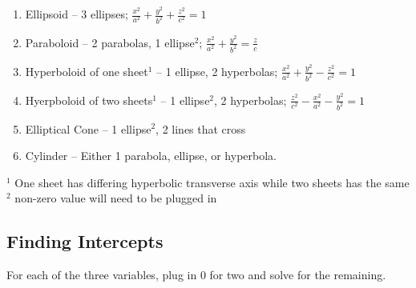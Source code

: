 \documentclass[12pt]{article}
\begin{document}
\begin{enumerate}
    \item Ellipsoid -- 3 ellipses; $\frac{x^2}{a^2}+\frac{y^2}{b^2}+\frac{z^2}{c^2}=1$
    \item Paraboloid -- 2 parabolas, 1 ellipse$^2$; $\frac{x^2}{a^2}+\frac{y^2}{b^2}=\frac{z}{c}$
    \item Hyperboloid of one sheet$^1$ -- 1 ellipse, 2 hyperbolas; $\frac{x^2}{a^2}+\frac{y^2}{b^2}-\frac{z^2}{c^2}=1$
    \item Hyerpboloid of two sheets$^1$ -- 1 ellipse$^2$, 2 hyperbolas; $\frac{z^2}{c^2}-\frac{x^2}{a^2}-\frac{y^2}{b^2}=1$
    \item Elliptical Cone -- 1 ellipse$^2$, 2 lines that cross
    \item Cylinder -- Either 1 parabola, ellipse, or hyperbola.
\end{enumerate}
$^1$ One sheet has differing hyperbolic transverse axis while two sheets has the same
\newline
$^2$ non-zero value will need to be plugged in

\subsection{Finding Intercepts}
For each of the three variables, plug in $0$ for two and solve for the remaining.
\end{document}
